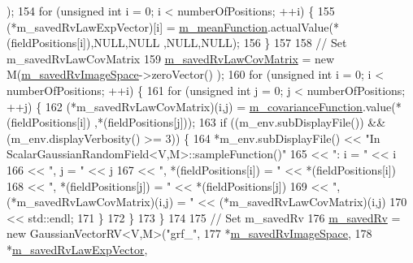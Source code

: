 \begin{DoxyCode}
      );
154     \textcolor{keywordflow}{for} (\textcolor{keywordtype}{unsigned} \textcolor{keywordtype}{int} i = 0; i < numberOfPositions; ++i) \{
155       (*m\_savedRvLawExpVector)[i] = \hyperlink{class_q_u_e_s_o_1_1_scalar_gaussian_random_field_a89e14e481690ccfa5536352018c7641f}{m\_meanFunction}.actualValue(*(fieldPositions[i]),NULL,NULL
      ,NULL,NULL);
156     \}
157 
158     \textcolor{comment}{// Set m\_savedRvLawCovMatrix}
159     \hyperlink{class_q_u_e_s_o_1_1_scalar_gaussian_random_field_aca6f26fffd99c7d8fee7a8300e623dcd}{m\_savedRvLawCovMatrix} = \textcolor{keyword}{new} M(\hyperlink{class_q_u_e_s_o_1_1_scalar_gaussian_random_field_aaffc22808e1c4a88073a171d781412a5}{m\_savedRvImageSpace}->zeroVector()
      );
160     \textcolor{keywordflow}{for} (\textcolor{keywordtype}{unsigned} \textcolor{keywordtype}{int} i = 0; i < numberOfPositions; ++i) \{
161       \textcolor{keywordflow}{for} (\textcolor{keywordtype}{unsigned} \textcolor{keywordtype}{int} j = 0; j < numberOfPositions; ++j) \{
162         (*m\_savedRvLawCovMatrix)(i,j) = \hyperlink{class_q_u_e_s_o_1_1_scalar_gaussian_random_field_a7db273a4030d7bede05d9d4ef0efd043}{m\_covarianceFunction}.value(*(fieldPositions[i])
      ,*(fieldPositions[j]));
163         \textcolor{keywordflow}{if} ((m\_env.subDisplayFile()) && (m\_env.displayVerbosity() >= 3)) \{
164           *m\_env.subDisplayFile() << \textcolor{stringliteral}{"In ScalarGaussianRandomField<V,M>::sampleFunction()"}
165                                   << \textcolor{stringliteral}{": i = "} << i
166                                   << \textcolor{stringliteral}{", j = "} << j
167                                   << \textcolor{stringliteral}{", *(fieldPositions[i]) = "} << *(fieldPositions[i])
168                                   << \textcolor{stringliteral}{", *(fieldPositions[j]) = "} << *(fieldPositions[j])
169                                   << \textcolor{stringliteral}{", (*m\_savedRvLawCovMatrix)(i,j) = "} << (*m\_savedRvLawCovMatrix)(i,j)
170                                   << std::endl;
171         \}
172       \}
173     \}
174 
175     \textcolor{comment}{// Set m\_savedRv}
176     \hyperlink{class_q_u_e_s_o_1_1_scalar_gaussian_random_field_ab8ca399444079041b75eb0986fe0fc80}{m\_savedRv} = \textcolor{keyword}{new} GaussianVectorRV<V,M>(\textcolor{stringliteral}{"grf\_"},
177                                                  *\hyperlink{class_q_u_e_s_o_1_1_scalar_gaussian_random_field_aaffc22808e1c4a88073a171d781412a5}{m\_savedRvImageSpace},
178                                                  *\hyperlink{class_q_u_e_s_o_1_1_scalar_gaussian_random_field_a0a59f8828711e204296d1cfb0ad6260a}{m\_savedRvLawExpVector},

\end{DoxyCode}
